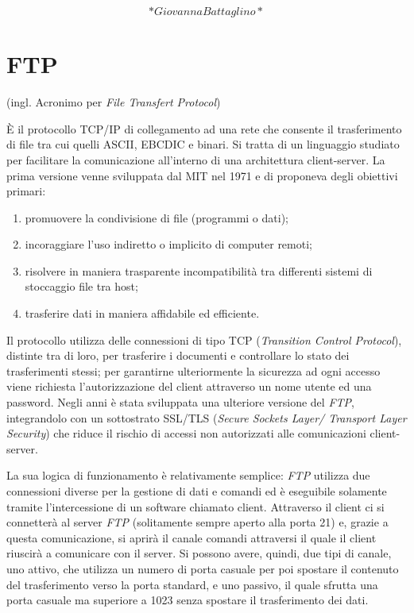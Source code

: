 \documentclass[
  b5paper,
  twoside,
  11pt,
  chapterprefix=false,
  bibliography=totocnumbered,
  listof=flat]{scrbook}
\begin{document}
\[*Giovanna Battaglino*\]

\hypertarget{ftp}{%
\chapter{FTP}\label{ftp}}

(ingl. Acronimo per \emph{File Transfert Protocol})

È il protocollo TCP/IP di collegamento ad una rete che consente il
trasferimento di file tra cui quelli ASCII, EBCDIC e binari. Si tratta
di un linguaggio studiato per facilitare la comunicazione all'interno di
una architettura client-server. La prima versione venne sviluppata dal
MIT nel 1971 e di proponeva degli obiettivi primari:

\begin{enumerate}
\def\labelenumi{\arabic{enumi}.}
\item
  promuovere la condivisione di file (programmi o dati);
\item
  incoraggiare l'uso indiretto o implicito di computer remoti;
\item
  risolvere in maniera trasparente incompatibilità tra differenti
  sistemi di stoccaggio file tra host;
\item
  trasferire dati in maniera affidabile ed efficiente.
\end{enumerate}

Il protocollo utilizza delle connessioni di tipo TCP (\emph{Transition
Control Protocol}), distinte tra di loro, per trasferire i documenti e
controllare lo stato dei trasferimenti stessi; per garantirne
ulteriormente la sicurezza ad ogni accesso viene richiesta
l'autorizzazione del client attraverso un nome utente ed una password.
Negli anni è stata sviluppata una ulteriore versione del \emph{FTP},
integrandolo con un sottostrato SSL/TLS (\emph{Secure Sockets Layer/
Transport Layer Security}) che riduce il rischio di accessi non
autorizzati alle comunicazioni client-server.

La sua logica di funzionamento è relativamente semplice: \emph{FTP} utilizza
due connessioni diverse per la gestione di dati e comandi ed è
eseguibile solamente tramite l'intercessione di un software chiamato
client. Attraverso il client ci si connetterà al server \emph{FTP}
(solitamente sempre aperto alla porta 21) e, grazie a questa
comunicazione, si aprirà il canale comandi attraversi il quale il client
riuscirà a comunicare con il server. Si possono avere, quindi, due tipi
di canale, uno attivo, che utilizza un numero di porta casuale per poi
spostare il contenuto del trasferimento verso la porta standard, e uno
passivo, il quale sfrutta una porta casuale ma superiore a 1023 senza
spostare il trasferimento dei dati.
\end{document}
